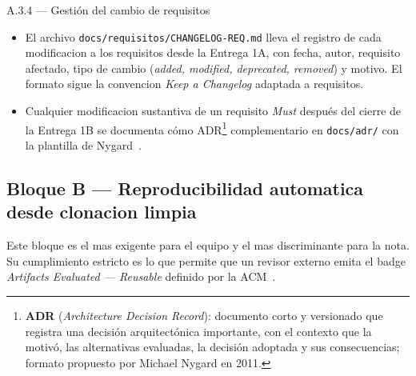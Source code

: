 \documentclass[11pt,a4paper]{article}
\begin{document}
\begin{cajaentregable}{A.3.4 --- Gesti\'{o}n del cambio de requisitos}
    \begin{itemize}
        \item El archivo \texttt{docs/requisitos/CHANGELOG-REQ.md} lleva el registro de cada modificacion a los requisitos desde la Entrega 1A, con fecha, autor, requisito afectado, tipo de cambio (\emph{added, modified, deprecated, removed}) y motivo. El formato sigue la convencion \emph{Keep a Changelog} adaptada a requisitos.
        \item Cualquier modificacion sustantiva de un requisito \emph{Must} despu\'{e}s del cierre de la Entrega 1B se documenta c\'{o}mo ADR\footnote{\textbf{ADR} (\emph{Architecture Decision Record}): documento corto y versionado que registra una decisi\'{o}n arquitect\'{o}nica importante, con el contexto que la motiv\'{o}, las alternativas evaluadas, la decisi\'{o}n adoptada y sus consecuencias; formato propuesto por Michael Nygard en 2011.} complementario en \texttt{docs/adr/} con la plantilla de Nygard~\cite{nygard2011adr,wiegers2013software}.
    \end{itemize}
\end{cajaentregable}

\subsection{Bloque B --- Reproducibilidad automatica desde clonacion limpia}

Este bloque es el mas exigente para el equipo y el mas discriminante para la nota. Su cumplimiento estricto es lo que permite que un revisor externo emita el badge \emph{Artifacts Evaluated --- Reusable} definido por la ACM~\cite{acm2020artifact}.
\end{document}
